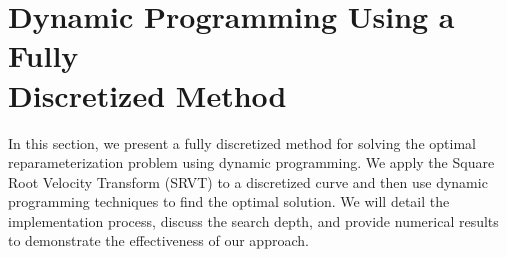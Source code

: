 \section[Dynamic Programming Using a Fully Discretized Method]{Dynamic Programming Using a Fully \\ Discretized Method}
\label{sec:dynamic-programming}

In this section, we present a fully discretized method for solving the optimal reparameterization problem using dynamic programming. We apply the Square Root Velocity Transform (SRVT) to a discretized curve and then use dynamic programming techniques to find the optimal solution. We will detail the implementation process, discuss the search depth, and provide numerical results to demonstrate the effectiveness of our approach.












